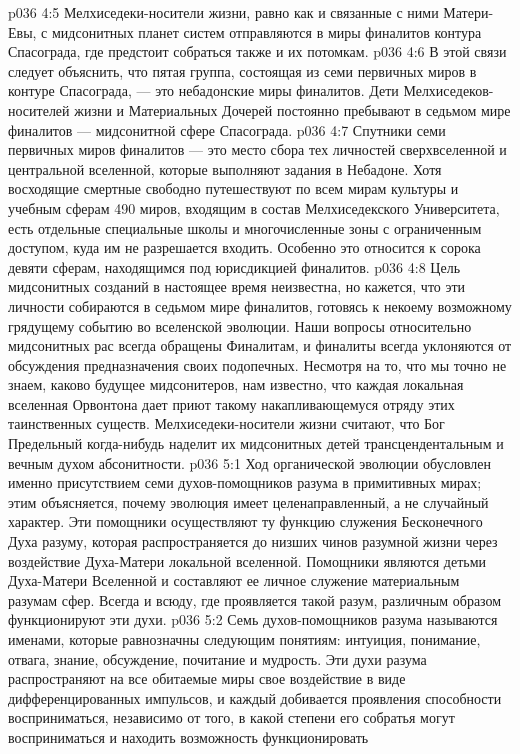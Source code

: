 \vs p036 4:5 \pc {} Мелхиседеки\hyp{}носители жизни, равно как и связанные с ними Матери\hyp{}Евы, с мидсонитных планет систем отправляются в миры финалитов контура Спасограда, где предстоит собраться также и их потомкам.
\vs p036 4:6 В этой связи следует объяснить, что пятая группа, состоящая из семи первичных миров в контуре Спасограда, --- это небадонские миры финалитов. Дети Мелхиседеков\hyp{}носителей жизни и Материальных Дочерей постоянно пребывают в седьмом мире финалитов --- мидсонитной сфере Спасограда.
\vs p036 4:7 Спутники семи первичных миров финалитов --- это место сбора тех личностей сверхвселенной и центральной вселенной, которые выполняют задания в Небадоне. Хотя восходящие смертные свободно путешествуют по всем мирам культуры и учебным сферам 490 миров, входящим в состав Мелхиседекского Университета, есть отдельные специальные школы и многочисленные зоны с ограниченным доступом, куда им не разрешается входить. Особенно это относится к сорока девяти сферам, находящимся под юрисдикцией финалитов.
\vs p036 4:8 \pc Цель мидсонитных созданий в настоящее время неизвестна, но кажется, что эти личности собираются в седьмом мире финалитов, готовясь к некоему возможному грядущему событию во вселенской эволюции. Наши вопросы относительно мидсонитных рас всегда обращены Финалитам, и финалиты всегда уклоняются от обсуждения предназначения своих подопечных. Несмотря на то, что мы точно не знаем, каково будущее мидсонитеров, нам известно, что каждая локальная вселенная Орвонтона дает приют такому накапливающемуся отряду этих таинственных существ. Мелхиседеки\hyp{}носители жизни считают, что Бог Предельный когда\hyp{}нибудь наделит их мидсонитных детей трансцендентальным и вечным духом абсонитности.
\vs p036 5:1 Ход органической эволюции обусловлен именно присутствием семи духов\hyp{}помощников разума в примитивных мирах; этим объясняется, почему эволюция имеет целенаправленный, а не случайный характер. Эти помощники осуществляют ту функцию служения Бесконечного Духа разуму, которая распространяется до низших чинов разумной жизни через воздействие Духа\hyp{}Матери локальной вселенной. Помощники являются детьми Духа\hyp{}Матери Вселенной и составляют ее личное служение материальным разумам сфер. Всегда и всюду, где проявляется такой разум, различным образом функционируют эти духи.
\vs p036 5:2 Семь духов\hyp{}помощников разума называются именами, которые равнозначны следующим понятиям: интуиция, понимание, отвага, знание, обсуждение, почитание и мудрость. Эти духи разума распространяют на все обитаемые миры свое воздействие в виде дифференцированных импульсов, и каждый добивается проявления способности восприниматься, независимо от того, в какой степени его собратья могут восприниматься и находить возможность функционировать
